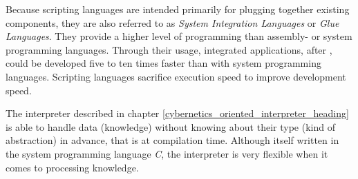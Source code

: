Because scripting languages are intended primarily for plugging together existing
components, they are also referred to as \emph{System Integration Languages} or
\emph{Glue Languages}. They provide a higher level of programming than assembly-
or system programming languages. Through their usage, integrated applications,
after \cite{ousterhout1998}, could be developed five to ten times faster than
with system programming languages. Scripting languages sacrifice execution speed
to improve development speed.

The interpreter described in chapter \ref{cybernetics_oriented_interpreter_heading}
is able to handle data (knowledge) without knowing about their type (kind of
abstraction) in advance, that is at compilation time. Although itself written
in the system programming language \emph{C}, the interpreter is very flexible
when it comes to processing knowledge.

